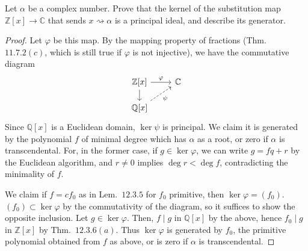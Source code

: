 \documentclass[12pt]{article}
\theoremstyle{remark}
\begin{document}
\setcounter{subsubsection}{5}
\begin{problem}
  Let $\alpha$ be a complex number. Prove that the kernel of the substitution map $\mathbb{Z}[x] \to \mathbb{C}$ that sends $x \rightsquigarrow \alpha$ is a principal ideal, and describe its generator.
\end{problem}
\begin{proof}
  Let $\varphi$ be this map. By the mapping property of fractions (Thm.~$11.7.2(c)$, which is still true if $\varphi$ is not injective), we have the commutative diagram
  \begin{equation*}
    \begin{tikzcd}[row sep=scriptsize]
      \mathbb{Z}[x]\rar{\varphi}\dar & \mathbb{C}\\
      \mathbb{Q}[x]\arrow[dashed]{ur}[swap]{\psi}
    \end{tikzcd}
  \end{equation*}
  Since $\mathbb{Q}[x]$ is a Euclidean domain, $\ker\psi$ is principal. We claim it is generated by the polynomial $f$ of minimal degree which has $\alpha$ as a root, or zero if $\alpha$ is transcendental. For, in the former case, if $g \in \ker\varphi$, we can write $g = fq + r$ by the Euclidean algorithm, and $r \ne 0$ implies $\deg r < \deg f$, contradicting the minimality of $f$.
  \par We claim if $f = cf_0$ as in Lem.~$12.3.5$ for $f_0$ primitive, then $\ker\varphi = (f_0)$. $(f_0) \subset \ker\varphi$ by the commutativity of the diagram, so it suffices to show the opposite inclusion. Let $g \in \ker\varphi$. Then, $f \mid g$ in $\mathbb{Q}[x]$ by the above, hence $f_0 \mid g$ in $\mathbb{Z}[x]$ by Thm.~$12.3.6(a)$. Thus $\ker\varphi$ is generated by $f_0$, the primitive polynomial obtained from $f$ as above, or is zero if $\alpha$ is transcendental.
\end{proof}
\end{document}
